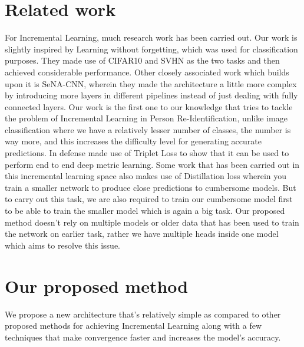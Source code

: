 \documentclass[10pt,twocolumn,letterpaper]{article}
\begin{document}
\section{Related work}

For Incremental Learning, much research work has been carried out. Our work is slightly inspired by Learning without forgetting\cite{li2016learning}, which was used for classification purposes. They made use of CIFAR10 and SVHN as the two tasks and then achieved considerable performance. Other closely associated work which builds upon it is SeNA-CNN\cite{zacarias2018a}, wherein they made the architecture a little more complex by introducing more layers in different pipelines instead of just dealing with fully connected layers. Our work is the first one to our knowledge that tries to tackle the problem of Incremental Learning in Person Re-Identification, unlike image classification where we have a relatively lesser number of classes, the number is way more, and this increases the difficulty level for generating accurate predictions. In defense\cite{DBLP:journals/corr/HermansBL17} made use of Triplet Loss to show that it can be used to perform end to end deep metric learning. Some work that has been carried out in this incremental learning space also makes use of Distillation\cite{44873} loss wherein you train a smaller network to produce close predictions to cumbersome models. But to carry out this task, we are also required to train our cumbersome model first to be able to train the smaller model which is again a big task. Our proposed method doesn't rely on multiple models or older data that has been used to train the network on earlier task, rather we have multiple heads inside one model which aims to resolve this issue.


\section{Our proposed method}
We propose a new architecture that's relatively simple as compared to other proposed methods for achieving Incremental Learning along with a few techniques that make convergence faster and increases the model's accuracy. 
\end{document}
